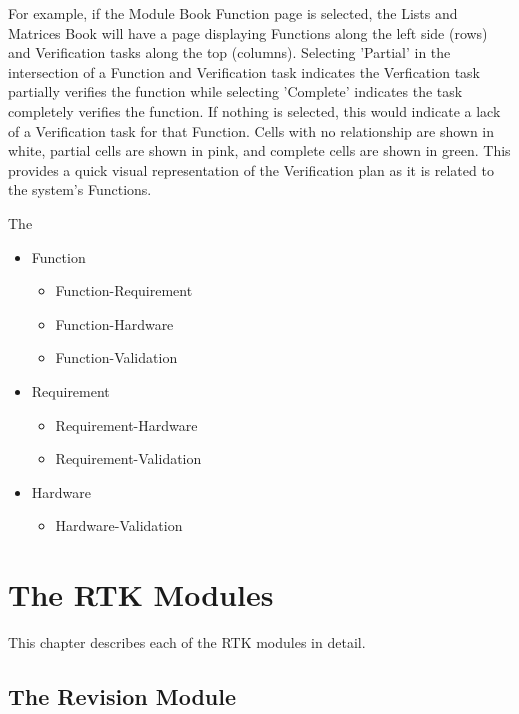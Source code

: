 \documentclass[twoside,12pt,letterpaper,openright]{book}
\begin{document}
\noindent For example, if the Module Book Function page is selected, the Lists
and Matrices Book will have a page displaying Functions along the left side
(rows) and Verification tasks along the top (columns).  Selecting 'Partial' in
the intersection of a Function and Verification task indicates the Verfication
task partially verifies the function while selecting 'Complete' indicates the
task completely verifies the function.  If nothing is selected, this would
indicate a lack of a Verification task for that Function.  Cells with no
relationship are shown in white, partial cells are shown in pink, and complete
cells are shown in green.  This provides a quick visual representation of the
Verification plan as it is related to the system's Functions.

\noindent The

\begin{itemize}
    \item Function
        \begin{itemize}
            \item Function-Requirement
            \item Function-Hardware
            \item Function-Validation
        \end{itemize}
    \item Requirement
        \begin{itemize}
            \item Requirement-Hardware
            \item Requirement-Validation
        \end{itemize}
    \item Hardware
        \begin{itemize}
            \item Hardware-Validation
        \end{itemize}
\end{itemize}


\chapter{The RTK Modules}

\noindent This chapter describes each of the RTK modules in detail.

\section{The Revision Module}
\end{document}
